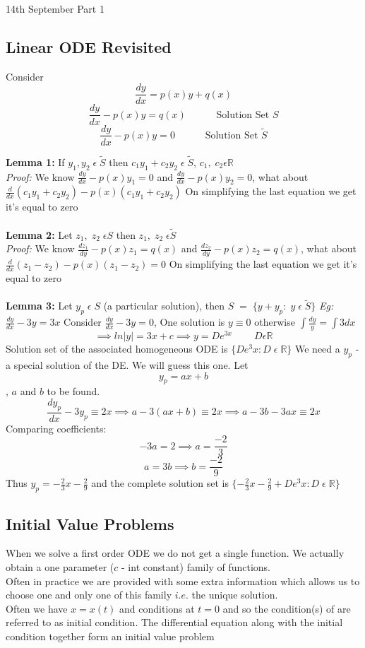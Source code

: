\documentclass[11pt]{article}
\theoremstyle{definition}
\newcommand{\R}{\mathbb{R}}
\begin{document}
\begin{center}
    {\LARGE 14th September Part 1}\\
\end{center}
\setcounter{subsection}{1}
\subsection{Linear ODE Revisited}
Consider $$\frac{dy}{dx} = p(x)y + q(x)$$
$$\frac{dy}{dx} - p(x)y = q(x) \;\;\;\;\;\;\;\;\;\;\;\text{Solution Set } S$$
$$\frac{dy}{dx} - p(x)y = 0 \;\;\;\;\;\;\;\;\;\;\;\text{Solution Set } \widetilde{S}$$

\textbf{Lemma 1:} If $y_1, y_2\; \epsilon\; \widetilde{S}$ then $c_1y_1 + c_2y_2\; \epsilon\; \widetilde{S}$, $c_1,\; c_2 \epsilon \R$ \\
\textit{Proof:} We know $\frac{dy}{dx} - p(x)y_1 = 0$ and $\frac{dy}{dx} - p(x)y_2 = 0$, what about $\frac{d}{dx}(c_1y_1 + c_2y_2) -p(x)(c_1y_1 + c_2y_2)$ On simplifying the last equation we get it's equal to zero \\\\
\textbf{Lemma 2:} Let $z_1,\;z_2\;\epsilon S$ then  $z_1,\;z_2\;\epsilon \widetilde{S}$\\
\textit{Proof:} We know $\frac{dz_1}{dy} - p(x)z_1 = q(x)$ and $\frac{dz_2}{dy} - p(x)z_2 = q(x)$, what about $\frac{d}{dx}(z_1-z_2) -p(x)(z_1-z_2) = 0$ On simplifying the last equation we get it's equal to zero \\\\
\textbf{Lemma 3:} Let $y_p\; \epsilon\; S$ (a particular solution), then $S\; =\; \{y+y_p:\; y\; \epsilon\; \widetilde{S}\}$
\textit{Eg: } $\frac{dy}{dx} -3y = 3x$
Consider  $\frac{dy}{dx} -3y = 0$, One solution is $y\equiv 0$ otherwise $\int\frac{dy}{y} = \int3dx$
$$\implies ln|y| = 3x + c \implies y = De^{3x}\;\;\;\;\;\;\;\; D \epsilon \R$$ Solution set of the associated homogeneous ODE is $\{De^3x: D\; \epsilon\; \R\}$
We need a $y_p$ - a special solution of the DE. We will guess this one. Let $$y_p = ax+b$$, $a$ and $b$ to be found.
$$\frac{dy_p}{dx} - 3y_p \equiv 2x \implies a -3(ax + b) \equiv 2x \implies a-3b - 3ax \equiv 2x$$
Comparing coefficients:
$$-3a = 2 \implies a = \frac{-2}{3}$$
$$a = 3b \implies b = \frac{-2}{9}$$
Thus $y_p = -\frac{2}{3}x - \frac{2}{9}$ and the complete solution set is $\{-\frac{2}{3}x - \frac{2}{9} + De^3x: D\; \epsilon\; \R\}$
\pagebreak
\subsection{Initial Value Problems}
When we solve a first order ODE we do not get a single function. We actually obtain a one parameter ($c$ - int constant) family of functions.\\
Often in practice we are provided with some extra information which allows us to choose one and only one of this family $i.e.$ the unique solution.\\
Often we have $x = x(t)$ and conditions at $t = 0$ and so the condition(s) of are referred to as initial condition.
The differential equation along with the initial condition together form an initial value problem
\end{document}
